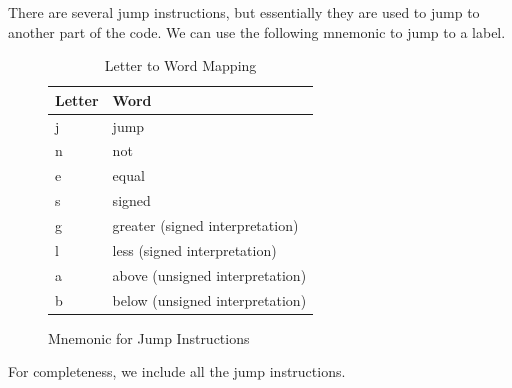   \begin{definition}[Jump]
    \label{def:jump}
    There are several jump instructions, but essentially they are used to jump to another part of the code. We can use the following mnemonic to jump to a label. 

    \begin{figure}[H]
      \centering 
      \begin{table}[H]
        \centering
        \begin{tabular}{|l|l|}
        \hline
        \textbf{Letter} & \textbf{Word} \\ \hline
        j & jump \\ \hline
        n & not \\ \hline
        e & equal \\ \hline
        s & signed \\ \hline
        g & greater (signed interpretation) \\ \hline
        l & less (signed interpretation) \\ \hline
        a & above (unsigned interpretation) \\ \hline
        b & below (unsigned interpretation) \\ \hline
        \end{tabular}
        \caption{Letter to Word Mapping}
        \label{table:letter_word_mapping}
      \end{table}
      \caption{Mnemonic for Jump Instructions} 
      \label{fig:jump_instructions_mnemonic}
    \end{figure}

    For completeness, we include all the jump instructions. 
      

\end{definition}
